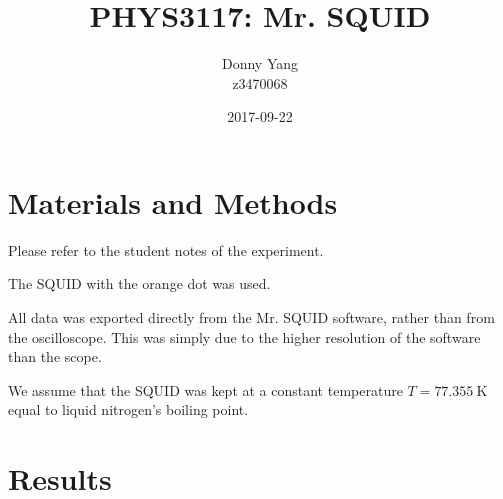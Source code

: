 \documentclass[a4paper]{scrartcl}
\begin{document}
\title{PHYS3117: Mr. SQUID}
\author{Donny Yang \\ z3470068}
\date{2017-09-22}
\maketitle

\section{Materials and Methods}
Please refer to the student notes of the experiment.

The SQUID with the orange dot was used.

All data was exported directly from the Mr. SQUID software, rather than from the oscilloscope. This was simply due to the higher resolution of the software than the scope.

We assume that the SQUID was kept at a constant temperature \(T = \SI{77.355}{\kelvin}\) equal to liquid nitrogen's boiling point.

\section{Results}
\end{document}
